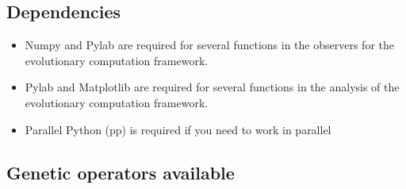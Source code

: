 \documentclass{article}
\begin{document}
\subsection{Dependencies}
\begin{itemize}
    \item Numpy and Pylab are required for several functions in the observers for the evolutionary computation framework.
    \item Pylab and Matplotlib are required for several functions in the analysis of the evolutionary computation framework.
    \item Parallel Python (pp) is required if you need to work in parallel
\end{itemize}
\subsection{Genetic operators available}
\end{document}
